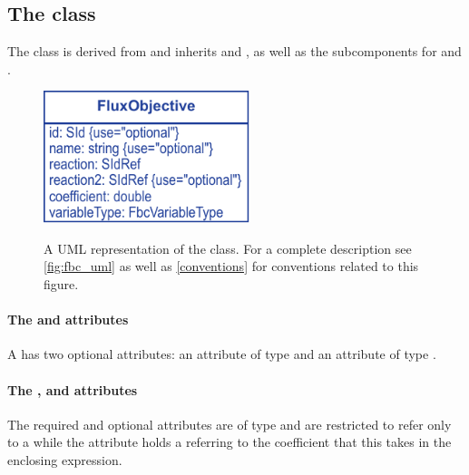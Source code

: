 \subsection{The \FBC {} class}
\label{fluxobjective-class}

The \FBC \FluxObjective class is derived from \SBML \SBase and inherits  and , as well as the subcomponents for \Annotation and \Notes.
%
%
\begin{figure}[ht]
  \centering
  \includegraphics[width=6cm]{images/fbc_v3_uml_fobj.pdf}\\
  \caption{A UML representation of the \FBCPackage \FluxObjective class. For a complete description see \ref{fig:fbc_uml} as well as \ref{conventions} for conventions related to this figure.}
  \label{fig:fbc_uml_userdefinedconstraint}
\end{figure}
%
%
\paragraph{The  and  attributes}
A \FluxObjective has two optional attributes:  an attribute of
type  and  an attribute of type .

\paragraph{The ,  and  attributes}
The required  and optional  attributes are of type  and are restricted
to refer only to a \Reaction while the  attribute
holds a  referring to the coefficient that this \FluxObjective
takes in the enclosing \Objective expression.

